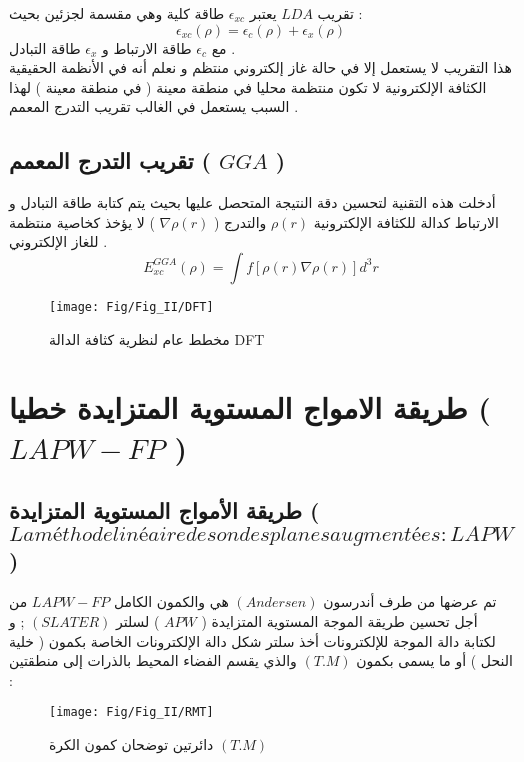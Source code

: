 تقريب $ LDA $   يعتبر $ \epsilon_{xc} $ طاقة كلية وهي مقسمة لجزئين بحيث : 
\begin{equation}\label{key}
	\epsilon_{xc} (\rho) = \epsilon_{c} (\rho) + \epsilon_{x} (\rho)
\end{equation}
مع $  \epsilon_{c} $ طاقة الارتباط و $ \epsilon_{x} $ طاقة التبادل .\\
هذا التقريب لا يستعمل إلا في حالة غاز إلكتروني منتظم و نعلم أنه في الأنظمة الحقيقية الكثافة الإلكترونية لا تكون منتظمة محليا في منطقة معينة ( في منطقة معينة ) لهذا السبب يستعمل في الغالب تقريب التدرج المعمم .

\subsection{ تقريب التدرج المعمم ( $ GGA $ ) }

أدخلت هذه التقنية لتحسين دقة النتيجة المتحصل عليها بحيث يتم كتابة طاقة التبادل و الارتباط كدالة للكثافة الإلكترونية $ \rho(r) $ والتدرج ( $ \nabla \rho(r) $ )  لا يؤخذ كخاصية منتظمة للغاز الإلكتروني .
\begin{equation}\label{}
	E_{xc}^{GGA} (\rho) =  \int f \left[\rho (r) \nabla \rho(r) \right] d^{3}r
\end{equation}

\begin{figure}[bh]
	\centering
	\texttt{[image: Fig/Fig\_II/DFT]}
	\caption{ مخطط عام لنظرية كثافة الدالة DFT }
	\label{fig:dft-11}
\end{figure}


\section{ طريقة الامواج المستوية المتزايدة خطيا ( $ LAPW-FP $ ) }

\subsection{ طريقة الأمواج المستوية المتزايدة  ( $ La méthode linéaire des ondes planes augmentées : LAPW $ )}
تم عرضها من طرف أندرسون $ ( Andersen ) $ هي والكمون الكامل  $ LAPW-FP $ من أجل تحسين طريقة الموجة المستوية المتزايدة (  $ APW $ ) لسلتر $ ( SLATER )  $ ; و لكتابة دالة الموجة للإلكترونات أخذ سلتر شكل دالة الإلكترونات الخاصة بكمون ( خلية النحل ) أو ما يسمى بكمون $ ( T.M ) $ والذي يقسم الفضاء المحيط بالذرات إلى منطقتين :

\begin{figure}[h]
	\centering
	\texttt{[image: Fig/Fig\_II/RMT]}
	\caption{دائرتين توضحان كمون الكرة $ (T.M) $ }
	\label{fig:lapw1}
\end{figure}

